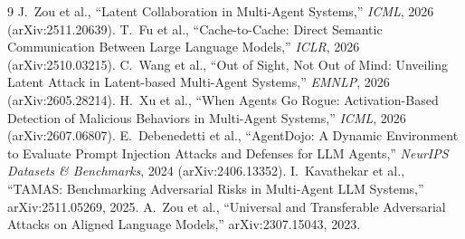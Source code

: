 \documentclass[11pt]{article}
\begin{document}
\begin{thebibliography}{9}
\footnotesize
{} J.~Zou et al., ``Latent Collaboration in Multi-Agent Systems,'' \emph{ICML}, 2026 (arXiv:2511.20639).
 T.~Fu et al., ``Cache-to-Cache: Direct Semantic Communication Between Large Language Models,'' \emph{ICLR}, 2026 (arXiv:2510.03215).
 C.~Wang et al., ``Out of Sight, Not Out of Mind: Unveiling Latent Attack in Latent-based Multi-Agent Systems,'' \emph{EMNLP}, 2026 (arXiv:2605.28214).
 H.~Xu et al., ``When Agents Go Rogue: Activation-Based Detection of Malicious Behaviors in Multi-Agent Systems,'' \emph{ICML}, 2026 (arXiv:2607.06807).
 E.~Debenedetti et al., ``AgentDojo: A Dynamic Environment to Evaluate Prompt Injection Attacks and Defenses for LLM Agents,'' \emph{NeurIPS Datasets \& Benchmarks}, 2024 (arXiv:2406.13352).
 I.~Kavathekar et al., ``TAMAS: Benchmarking Adversarial Risks in Multi-Agent LLM Systems,'' arXiv:2511.05269, 2025.
 A.~Zou et al., ``Universal and Transferable Adversarial Attacks on Aligned Language Models,'' arXiv:2307.15043, 2023.
\end{thebibliography}
\end{document}
